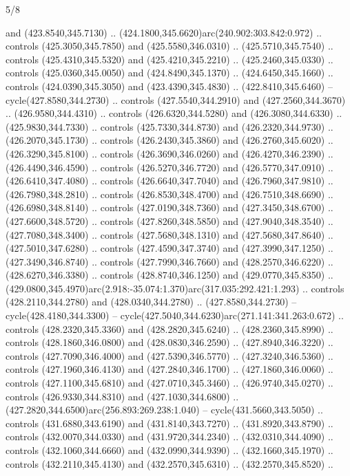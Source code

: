 \begin{flagdescription}{5/8}
\begin{scope}[xshift=0.5\flaglength,yshift=0.5\flagwidth,scale=\flagwidth/475.63]
\begin{scope}[y=0.8pt, x=0.8pt, yscale=-1, xscale=1,shift={(-450,-300)}]
\begin{scope}[cm={{1.0,0.0,0.0,1.0,(-0.0002,0.12556)}},cm={{1.0,0.0,0.0,1.0,(0.00179,0.0)}}]
\begin{scope}[cm={{1.01375,0.0,0.0,1.01375,(-5.36379,-4.94943)}}]
  and (423.8540,345.7130) .. (424.1800,345.6620)arc(240.902:303.842:0.972) ..
  controls (425.3050,345.7850) and (425.5580,346.0310) .. (425.5710,345.7540) ..
  controls (425.4310,345.5320) and (425.4210,345.2210) .. (425.2460,345.0330) ..
  controls (425.0360,345.0050) and (424.8490,345.1370) .. (424.6450,345.1660) ..
  controls (424.0390,345.3050) and (423.4390,345.4830) .. (422.8410,345.6460) --
  cycle(427.8580,344.2730) .. controls (427.5540,344.2910) and
  (427.2560,344.3670) .. (426.9580,344.4310) .. controls (426.6320,344.5280) and
  (426.3080,344.6330) .. (425.9830,344.7330) .. controls (425.7330,344.8730) and
  (426.2320,344.9730) .. (426.2070,345.1730) .. controls (426.2430,345.3860) and
  (426.2760,345.6020) .. (426.3290,345.8100) .. controls (426.3690,346.0260) and
  (426.4270,346.2390) .. (426.4490,346.4590) .. controls (426.5270,346.7720) and
  (426.5770,347.0910) .. (426.6410,347.4080) .. controls (426.6640,347.7040) and
  (426.7960,347.9810) .. (426.7980,348.2810) .. controls (426.8530,348.4700) and
  (426.7510,348.6690) .. (426.6980,348.8140) .. controls (427.0190,348.7360) and
  (427.3450,348.6700) .. (427.6600,348.5720) .. controls (427.8260,348.5850) and
  (427.9040,348.3540) .. (427.7080,348.3400) .. controls (427.5680,348.1310) and
  (427.5680,347.8640) .. (427.5010,347.6280) .. controls (427.4590,347.3740) and
  (427.3990,347.1250) .. (427.3490,346.8740) .. controls (427.7990,346.7660) and
  (428.2570,346.6220) .. (428.6270,346.3380) .. controls (428.8740,346.1250) and
  (429.0770,345.8350) ..
  (429.0800,345.4970)arc(2.918:-35.074:1.370)arc(317.035:292.421:1.293) ..
  controls (428.2110,344.2780) and (428.0340,344.2780) .. (427.8580,344.2730) --
  cycle(428.4180,344.3300) -- cycle(427.5040,344.6230)arc(271.141:341.263:0.672)
  .. controls (428.2320,345.3360) and (428.2820,345.6240) .. (428.2360,345.8990)
  .. controls (428.1860,346.0800) and (428.0830,346.2590) .. (427.8940,346.3220)
  .. controls (427.7090,346.4000) and (427.5390,346.5770) .. (427.3240,346.5360)
  .. controls (427.1960,346.4130) and (427.2840,346.1700) .. (427.1860,346.0060)
  .. controls (427.1100,345.6810) and (427.0710,345.3460) .. (426.9740,345.0270)
  .. controls (426.9330,344.8310) and (427.1030,344.6800) ..
  (427.2820,344.6500)arc(256.893:269.238:1.040) -- cycle(431.5660,343.5050) ..
  controls (431.6880,343.6190) and (431.8140,343.7270) .. (431.8920,343.8790) ..
  controls (432.0070,344.0330) and (431.9720,344.2340) .. (432.0310,344.4090) ..
  controls (432.1060,344.6660) and (432.0990,344.9390) .. (432.1660,345.1970) ..
  controls (432.2110,345.4130) and (432.2570,345.6310) .. (432.2570,345.8520) ..

\end{scope}
\end{scope}
\end{scope}
\end{scope}
\end{flagdescription}
